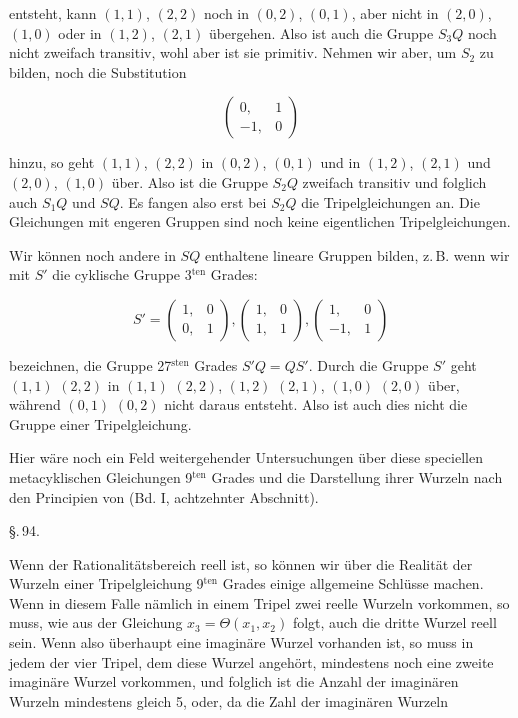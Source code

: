 entsteht, kann $(1,1)$, $(2,2)$ noch in $(0,2)$, $(0,1)$, aber nicht in
$(2,0)$, $(1,0)$ oder in $(1,2)$, $(2,1)$ übergehen. Also ist auch die Gruppe $S_3 Q$ noch nicht
zweifach transitiv, wohl aber ist sie primitiv. Nehmen wir aber, um $S_2$
zu bilden, noch die Substitution

\[
\begin{pmatrix} 0, & 1 \\ -1, & 0 \end{pmatrix}
\]

hinzu, so geht $(1,1)$, $(2,2)$ in $(0,2)$, $(0,1)$ und in $(1,2)$, $(2,1)$ und
$(2,0)$, $(1,0)$ über. Also ist die Gruppe $S_2 Q$ zweifach transitiv und folglich
auch $S_1 Q$ und $S Q$. Es fangen also erst bei $S_2 Q$ die Tripelgleichungen an.
Die Gleichungen mit engeren Gruppen sind noch keine eigentlichen Tripelgleichungen.

Wir können noch andere in $S Q$ enthaltene lineare Gruppen bilden, z.\,B. wenn wir
mit $S'$ die cyklische Gruppe 3$^{\mathrm{ten}}$ Grades:

\[
S' = \begin{pmatrix} 1, & 0 \\ 0, & 1 \end{pmatrix}, \begin{pmatrix} 1, & 0 \\ 1, & 1 \end{pmatrix}, \begin{pmatrix} 1, & 0 \\ -1, & 1 \end{pmatrix}
\]

bezeichnen, die Gruppe 27$^{\mathrm{sten}}$ Grades $S' Q = Q S'$. Durch die Gruppe $S'$
geht $(1,1)$ $(2,2)$ in $(1,1)$ $(2,2)$, $(1,2)$ $(2,1)$, $(1,0)$ $(2,0)$ über, während
$(0,1)$ $(0,2)$ nicht daraus entsteht. Also ist auch dies nicht die Gruppe einer
Tripelgleichung.

Hier wäre noch ein Feld weitergehender Untersuchungen über diese speciellen
metacyklischen Gleichungen 9$^{\mathrm{ten}}$ Grades und die Darstellung ihrer
Wurzeln nach den Principien von  (Bd. I, achtzehnter Abschnitt).

\begin{center}
\S.\,94.\\[2pt]
\end{center}

Wenn der Rationalitätsbereich reell ist, so können wir über die Realität der Wurzeln
einer Tripelgleichung 9$^{\mathrm{ten}}$ Grades einige allgemeine Schlüsse machen.
Wenn in diesem Falle nämlich in einem Tripel zwei reelle Wurzeln vorkommen, so muss,
wie aus der Gleichung $x_3 = \Theta (x_1, x_2)$ folgt, auch die dritte Wurzel reell
sein. Wenn also überhaupt eine imaginäre Wurzel vorhanden ist, so muss in jedem der
vier Tripel, dem diese Wurzel angehört, mindestens noch eine zweite imaginäre Wurzel
vorkommen, und folglich ist die Anzahl der imaginären Wurzeln mindestens gleich 5,
oder, da die Zahl der imaginären Wurzeln

